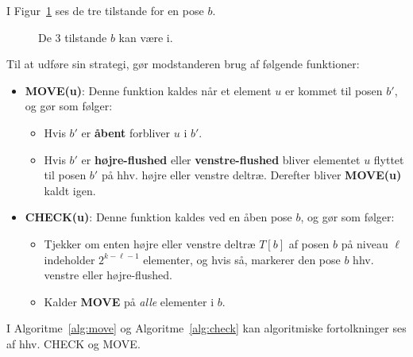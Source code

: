 I Figur~\ref{fig:flushes} ses de tre tilstande for en pose $b$.

\begin{figure}[ht]
\centering
{}
  \caption{\label{fig:flushes} De 3 tilstande $b$ kan være i.}
\end{figure}

Til at udføre sin strategi, gør modstanderen brug af følgende funktioner:
\begin{itemize}
  \item \textbf{MOVE(u)}: Denne funktion kaldes når et element $u$ er kommet til posen $b'$, og gør som følger:
        \begin{itemize}
          \item Hvis $b'$ er \textbf{åbent} forbliver $u$ i $b'$.
          \item Hvis $b'$ er \textbf{højre-flushed} eller \textbf{venstre-flushed} bliver elementet $u$ flyttet til posen $b'$ på hhv. højre eller venstre deltræ. Derefter bliver \textbf{MOVE(u)} kaldt igen.
        \end{itemize}
  \item \textbf{CHECK(u)}: Denne funktion kaldes ved en åben pose $b$, og gør som følger:
        \begin{itemize}
          \item Tjekker om enten højre eller venstre deltræ $T[b]$ af posen $b$ på niveau $\ell$ indeholder $2^{k-\ell-1}$ elementer, og hvis så, markerer den pose $b$ hhv. venstre eller højre-flushed.
          \item Kalder \textbf{MOVE} på \textit{alle} elementer i $b$.
        \end{itemize}
\end{itemize}

I Algoritme~\ref{alg:move} og Algoritme~\ref{alg:check} kan algoritmiske fortolkninger ses af hhv. CHECK og MOVE.

